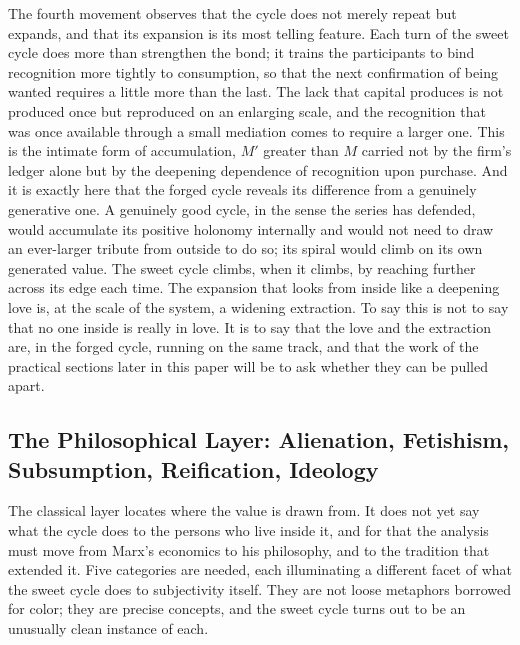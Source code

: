 \documentclass[11pt,a4paper]{article}
\begin{document}
The fourth movement observes that the cycle does not merely repeat but expands, and that its expansion is its most telling feature. Each turn of the sweet cycle does more than strengthen the bond; it trains the participants to bind recognition more tightly to consumption, so that the next confirmation of being wanted requires a little more than the last. The lack that capital produces is not produced once but reproduced on an enlarging scale, and the recognition that was once available through a small mediation comes to require a larger one. This is the intimate form of accumulation, $M'$ greater than $M$ carried not by the firm's ledger alone but by the deepening dependence of recognition upon purchase. And it is exactly here that the forged cycle reveals its difference from a genuinely generative one. A genuinely good cycle, in the sense the series has defended, would accumulate its positive holonomy internally and would not need to draw an ever-larger tribute from outside to do so; its spiral would climb on its own generated value. The sweet cycle climbs, when it climbs, by reaching further across its edge each time. The expansion that looks from inside like a deepening love is, at the scale of the system, a widening extraction. To say this is not to say that no one inside is really in love. It is to say that the love and the extraction are, in the forged cycle, running on the same track, and that the work of the practical sections later in this paper will be to ask whether they can be pulled apart.

\subsection{The Philosophical Layer: Alienation, Fetishism, Subsumption, Reification, Ideology}

The classical layer locates where the value is drawn from. It does not yet say what the cycle does to the persons who live inside it, and for that the analysis must move from Marx's economics to his philosophy, and to the tradition that extended it. Five categories are needed, each illuminating a different facet of what the sweet cycle does to subjectivity itself. They are not loose metaphors borrowed for color; they are precise concepts, and the sweet cycle turns out to be an unusually clean instance of each.
\end{document}
